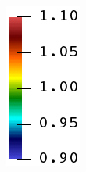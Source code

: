 \begin{figure}[!htbp]
\begin{subfigure}[b]{0.08\textwidth}
    \includegraphics[width=\textwidth]{Chapter4/figures/rainbow_vertical.png}
    \vspace{0.15in}
  \end{subfigure}
  

\end{figure}
